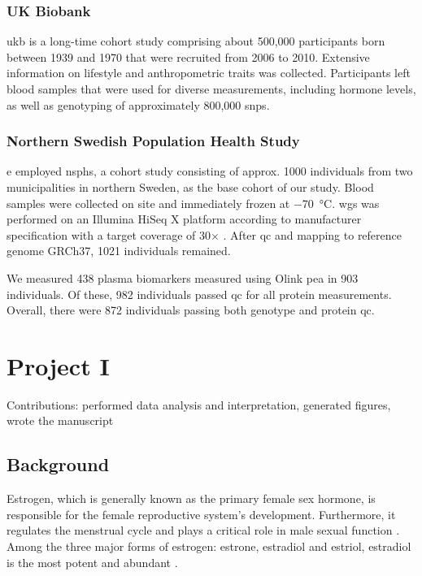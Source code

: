 \documentclass[twoside=false]{scrbook}
\begin{document}
\subsection{UK Biobank}
\Gls{ukb} is a long-time cohort study comprising about 500,000 participants born between 1939 and 1970 that were recruited from 2006 to 2010.
Extensive information on lifestyle and anthropometric traits was collected.
Participants left blood samples that were used for diverse measurements, including hormone levels, as well as genotyping of approximately 800,000 \glspl{snp}.

\subsection{Northern Swedish Population Health Study}
e employed \gls{nsphs}, a cohort study consisting of approx. 1000 individuals from two municipalities in northern Sweden, as the base cohort of our study.
Blood samples were collected on site and immediately frozen at \qty{-70}{\celsius}.
\Gls{wgs} was performed on an Illumina HiSeq X platform according to manufacturer specification with a target coverage of 30$\times$ \cite{Ameur2017}.
After \gls{qc} and mapping to reference genome GRCh37, 1021 individuals remained.

We measured 438 plasma biomarkers measured using Olink \gls{pea} in 903 individuals.
Of these, 982 individuals passed \gls{qc} for all protein measurements.
Overall, there were 872 individuals passing both genotype and protein \gls{qc}.



\chapter{Project I}
{
    \parindent 0pt \color{gray}
    Contributions: performed data analysis and interpretation, generated figures, wrote the manuscript
}

\section{Background}
Estrogen, which is generally known as the primary female sex hormone, is responsible for the female reproductive system's development.
Furthermore, it regulates the menstrual cycle and plays a critical role in male sexual function \cite{Bates2013b,Hess1997b}. 
Among the three major forms of estrogen: estrone, estradiol and estriol, estradiol is the most potent and abundant \cite{Thomas2013c}.
\end{document}
